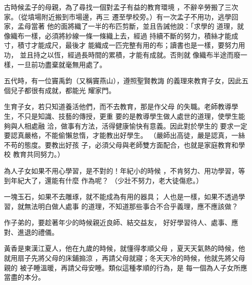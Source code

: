 \documentclass[avery5371,grid]{flashcards}
\begin{document}
{古時候孟子的母親，為了尋找一個對孟子有益的教育環境
，不辭辛勞搬了三次家。（從墳場附近搬到市場邊，再三
遷至學校旁。）有一次孟子不用功，逃學回家，孟母當著
他的面將織了一半的布匹剪斷，並且告誡他說：「求學的
道理，就像織布一樣，必須將紗線一條一條織上去，經過
持續不斷的努力，積絲才能成寸，積寸才能成尺，最後才
能織成一匹完整有用的布；讀書也是一樣，要努力用功，
並且持之以恆，經過長時間的累積，才能有成就。否則就
像織布半途而廢一樣，一旦前功盡棄就毫無用處了。} %
{} %

{五代時，有一位竇禹鈞（又稱竇燕山），遵照聖賢教誨
的義理來教育子女，因此五個兒子都很有成就，都能光
耀家門。} %
{} %

{生育子女，若只知道養活他們，而不去教育，那是作父母
的失職。老師教導學生，不只是知識、技藝的傳授，更重
要的是教導學生做人處世的道理，使學生能夠與人相處融
洽，做事有方法，活得健康愉快有意義。因此對於學生的
要求一定要認真嚴格，不能偷懶怠惰，才能教出好學生。} %
{（嚴師出高徒，嚴是認真，一絲不苟的態度。要教出好孩
子，必須父母與老師雙方面配合，也就是家庭教育和學校
教育共同努力。）} %




{為人子女如果不用心學習，是不對的！年紀小的時候
，不肯努力、用功學習，等到年紀大了，還能有什麼
作為呢？} %
{（少壯不努力，老大徒傷悲。）} %



{一塊玉石，如果不去雕琢，就不能成為有用的器具；
人也是一樣，如果不透過學習，就無法明白做人處事
的道理，不知道那些事合不合乎義理，應不應該做？} %
{} %


{作子弟的，要趁著年少的時候親近良師、結交益友，
好好學習待人、處事、應對、進退的禮儀。} %
{} %



{黃香是東漢江夏人，他在九歲的時候，就懂得孝順父母
，夏天天氣熱的時候，他就用扇子先將父母的床鋪搧涼
，再請父母就寢；冬天天冷的時候，他就先將父母親的
被子睡溫暖，再請父母安睡。類似這種孝順的行為，是
每一個為人子女所應當盡的本分。} %
{} %
\end{document}
